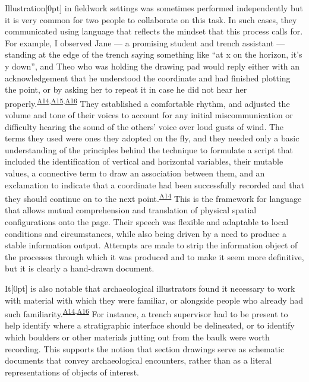 \documentclass[
]{article}
\newcommand{\paragraphnumber}[1]{\marginnote{\color{lightgray}\tiny{#1}}[0pt]}
\begin{document}
Illustration\paragraphnumber{[53]} in fieldwork settings was sometimes
performed independently but it is very common for two people to
collaborate on this task. In such cases, they communicated using
language that reflects the mindset that this process calls for. For
example, I observed Jane --- a promising student and trench assistant
--- standing at the edge of the trench saying something like ``at x on
the horizon, it's y down'', and Theo who was holding the drawing pad
would reply either with an acknowledgement that he understood the
coordinate and had finished plotting the point, or by asking her to
repeat it in case he did not hear her
properly.\textsuperscript{\hyperref[sec-A14]{A14},\hyperref[sec-15]{A15},\hyperref[sec-A16]{A16}}
They established a comfortable rhythm, and adjusted the volume and tone
of their voices to account for any initial miscommunication or
difficulty hearing the sound of the others' voice over loud gusts of
wind. The terms they used were ones they adopted on the fly, and they
needed only a basic understanding of the principles behind the technique
to formulate a script that included the identification of vertical and
horizontal variables, their mutable values, a connective term to draw an
association between them, and an exclamation to indicate that a
coordinate had been successfully recorded and that they should continue
on to the next point.\textsuperscript{\hyperref[sec-A14]{A14}} This is
the framework for language that allows mutual comprehension and
translation of physical spatial configurations onto the page. Their
speech was flexible and adaptable to local conditions and circumstances,
while also being driven by a need to produce a stable information
output. Attempts are made to strip the information object of the
processes through which it was produced and to make it seem more
definitive, but it is clearly a hand-drawn document.

It\paragraphnumber{[54]} is also notable that archaeological
illustrators found it necessary to work with material with which they
were familiar, or alongside people who already had such
familiarity.\textsuperscript{\hyperref[sec-A14]{A14},\hyperref[sec-A16]{A16}}
For instance, a trench supervisor had to be present to help identify
where a stratigraphic interface should be delineated, or to identify
which boulders or other materials jutting out from the baulk were worth
recording. This supports the notion that section drawings serve as
schematic documents that convey archaeological encounters, rather than
as a literal representations of objects of interest.
\end{document}
